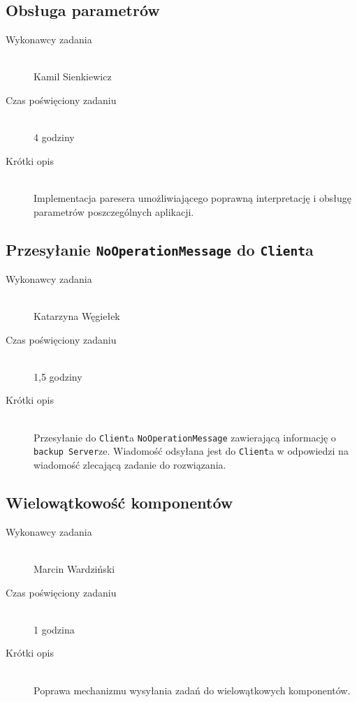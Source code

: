 \documentclass[a4paper]{article}
\begin{document}
\subsection{Obsługa parametrów}
\begin{description}
    \item[Wykonawcy zadania] \hfill \\ Kamil Sienkiewicz
    \item[Czas poświęciony zadaniu] \hfill \\ 4 godziny
    \item[Krótki opis] \hfill \\ Implementacja paresera umożliwiającego poprawną interpretację i obsługę parametrów poszczególnych aplikacji.
\end{description}

\subsection{Przesyłanie \texttt{NoOperationMessage} do \texttt{Client}a}
\begin{description}
    \item[Wykonawcy zadania] \hfill \\ Katarzyna Węgiełek
    \item[Czas poświęciony zadaniu] \hfill \\ 1,5 godziny
    \item[Krótki opis] \hfill \\ Przesyłanie do \texttt{Client}a \texttt{NoOperationMessage} zawierającą informację o \texttt{backup Server}ze. Wiadomość odsyłana jest do \texttt{Client}a w odpowiedzi na wiadomość zlecającą zadanie do rozwiązania.
\end{description}
   
\subsection{Wielowątkowość komponentów}
\begin{description}
    \item[Wykonawcy zadania] \hfill \\ Marcin Wardziński
    \item[Czas poświęciony zadaniu] \hfill \\ 1 godzina
    \item[Krótki opis] \hfill \\ Poprawa mechanizmu wysyłania zadań do wielowątkowych komponentów.
\end{description}   
\end{document}
